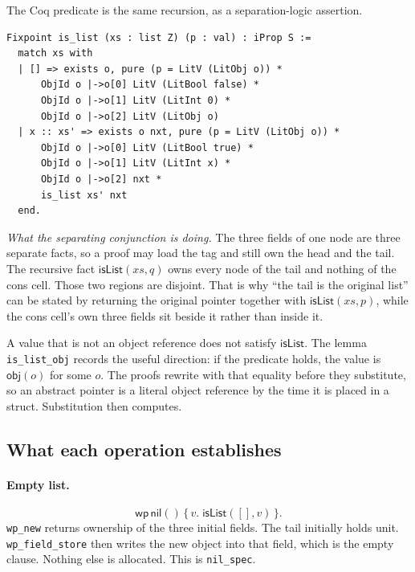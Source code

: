 \documentclass[11pt]{article}
\newcommand{\Wpre}{\mathsf{wp}}
\begin{document}
The Coq predicate is the same recursion, as a separation-logic assertion.

\begin{lstlisting}
Fixpoint is_list (xs : list Z) (p : val) : iProp S :=
  match xs with
  | [] => exists o, pure (p = LitV (LitObj o)) *
      ObjId o |->o[0] LitV (LitBool false) *
      ObjId o |->o[1] LitV (LitInt 0) *
      ObjId o |->o[2] LitV (LitObj o)
  | x :: xs' => exists o nxt, pure (p = LitV (LitObj o)) *
      ObjId o |->o[0] LitV (LitBool true) *
      ObjId o |->o[1] LitV (LitInt x) *
      ObjId o |->o[2] nxt *
      is_list xs' nxt
  end.
\end{lstlisting}

\textit{What the separating conjunction is doing.}
The three fields of one node are three separate facts, so a proof may load the tag and still own the head and the tail.
The recursive fact \(\mathsf{isList}(xs, q)\) owns every node of the tail and nothing of the cons cell.
Those two regions are disjoint.
That is why ``the tail is the original list'' can be stated by returning the original pointer together with \(\mathsf{isList}(xs, p)\), while the cons cell's own three fields sit beside it rather than inside it.

A value that is not an object reference does not satisfy \(\mathsf{isList}\).
The lemma \texttt{is\_list\_obj} records the useful direction: if the predicate holds, the value is \(\mathsf{obj}(o)\) for some \(o\).
The proofs rewrite with that equality before they substitute, so an abstract pointer is a literal object reference by the time it is placed in a struct.
Substitution then computes.

\subsection{What each operation establishes}

\paragraph{Empty list.}
\[
\Wpre\,\mathsf{nil}()\,\{\,v.\; \mathsf{isList}([], v)\,\}.
\]
\texttt{wp\_new} returns ownership of the three initial fields. The tail initially holds unit.
\texttt{wp\_field\_store} then writes the new object into that field, which is the empty clause.
Nothing else is allocated.
This is \texttt{nil\_spec}.
\end{document}
